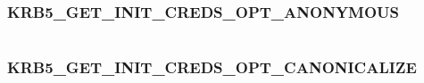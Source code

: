 \documentclass[letterpaper,10pt,english]{sphinxmanual}
\begin{document}
\begin{tabulary}{\linewidth}{|L|L|}
\hline

 & 
\\\hline
\end{tabulary}



\subsubsection{KRB5\_GET\_INIT\_CREDS\_OPT\_ANONYMOUS}
\label{appdev/refs/macros/KRB5_GET_INIT_CREDS_OPT_ANONYMOUS:krb5-get-init-creds-opt-anonymous-data}\label{appdev/refs/macros/KRB5_GET_INIT_CREDS_OPT_ANONYMOUS::doc}\label{appdev/refs/macros/KRB5_GET_INIT_CREDS_OPT_ANONYMOUS:krb5-get-init-creds-opt-anonymous}

\begin{fulllineitems}
\label{appdev/refs/macros/KRB5_GET_INIT_CREDS_OPT_ANONYMOUS:KRB5_GET_INIT_CREDS_OPT_ANONYMOUS}
\end{fulllineitems}


\begin{tabulary}{\linewidth}{|L|L|}
\hline

 & 
\\\hline
\end{tabulary}



\subsubsection{KRB5\_GET\_INIT\_CREDS\_OPT\_CANONICALIZE}
\label{appdev/refs/macros/KRB5_GET_INIT_CREDS_OPT_CANONICALIZE::doc}\label{appdev/refs/macros/KRB5_GET_INIT_CREDS_OPT_CANONICALIZE:krb5-get-init-creds-opt-canonicalize-data}\label{appdev/refs/macros/KRB5_GET_INIT_CREDS_OPT_CANONICALIZE:krb5-get-init-creds-opt-canonicalize}

\begin{fulllineitems}
\label{appdev/refs/macros/KRB5_GET_INIT_CREDS_OPT_CANONICALIZE:KRB5_GET_INIT_CREDS_OPT_CANONICALIZE}
\end{fulllineitems}
\end{document}
